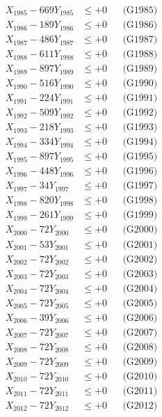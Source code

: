 \documentclass[a4paper,10pt]{article}
\begin{document}
{\begin{align}
X_{1985} - 669Y_{1985} &\leq +0 && \text{(G1985)} \\
X_{1986} - 189Y_{1986} &\leq +0 && \text{(G1986)} \\
X_{1987} - 486Y_{1987} &\leq +0 && \text{(G1987)} \\
X_{1988} - 611Y_{1988} &\leq +0 && \text{(G1988)} \\
X_{1989} - 897Y_{1989} &\leq +0 && \text{(G1989)} \\
X_{1990} - 516Y_{1990} &\leq +0 && \text{(G1990)} \\
\allowbreak
X_{1991} - 224Y_{1991} &\leq +0 && \text{(G1991)} \\
X_{1992} - 509Y_{1992} &\leq +0 && \text{(G1992)} \\
X_{1993} - 218Y_{1993} &\leq +0 && \text{(G1993)} \\
X_{1994} - 334Y_{1994} &\leq +0 && \text{(G1994)} \\
X_{1995} - 897Y_{1995} &\leq +0 && \text{(G1995)} \\
X_{1996} - 448Y_{1996} &\leq +0 && \text{(G1996)} \\
X_{1997} - 34Y_{1997} &\leq +0 && \text{(G1997)} \\
X_{1998} - 820Y_{1998} &\leq +0 && \text{(G1998)} \\
X_{1999} - 261Y_{1999} &\leq +0 && \text{(G1999)} \\
X_{2000} - 72Y_{2000} &\leq +0 && \text{(G2000)} \\
\allowbreak
X_{2001} - 53Y_{2001} &\leq +0 && \text{(G2001)} \\
X_{2002} - 72Y_{2002} &\leq +0 && \text{(G2002)} \\
X_{2003} - 72Y_{2003} &\leq +0 && \text{(G2003)} \\
X_{2004} - 72Y_{2004} &\leq +0 && \text{(G2004)} \\
X_{2005} - 72Y_{2005} &\leq +0 && \text{(G2005)} \\
X_{2006} - 39Y_{2006} &\leq +0 && \text{(G2006)} \\
X_{2007} - 72Y_{2007} &\leq +0 && \text{(G2007)} \\
X_{2008} - 72Y_{2008} &\leq +0 && \text{(G2008)} \\
X_{2009} - 72Y_{2009} &\leq +0 && \text{(G2009)} \\
X_{2010} - 72Y_{2010} &\leq +0 && \text{(G2010)} \\
\allowbreak
X_{2011} - 72Y_{2011} &\leq +0 && \text{(G2011)} \\
X_{2012} - 72Y_{2012} &\leq +0 && \text{(G2012)} \\

\end{align}}
\end{document}
